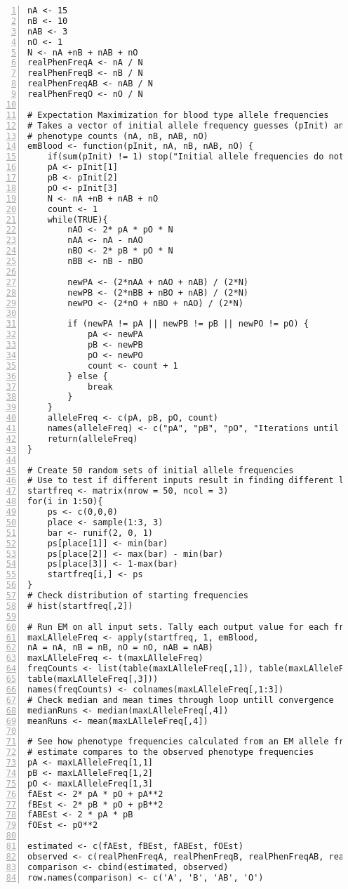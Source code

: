 \documentclass{article}
\begin{document}
	\begin{linenumbers}
		\begin{Verbatim}[numbers=left]
nA <- 15
nB <- 10
nAB <- 3
nO <- 1 
N <- nA +nB + nAB + nO
realPhenFreqA <- nA / N 
realPhenFreqB <- nB / N
realPhenFreqAB <- nAB / N
realPhenFreqO <- nO / N

# Expectation Maximization for blood type allele frequencies
# Takes a vector of initial allele frequency guesses (pInit) and observed
# phenotype counts (nA, nB, nAB, nO)
emBlood <- function(pInit, nA, nB, nAB, nO) {
	if(sum(pInit) != 1) stop("Initial allele frequencies do not sum to 1")
	pA <- pInit[1]
	pB <- pInit[2]
	pO <- pInit[3]
	N <- nA +nB + nAB + nO
	count <- 1
	while(TRUE){
		nAO <- 2* pA * pO * N
		nAA <- nA - nAO
		nBO <- 2* pB * pO * N
		nBB <- nB - nBO
		
		newPA <- (2*nAA + nAO + nAB) / (2*N)
		newPB <- (2*nBB + nBO + nAB) / (2*N)
		newPO <- (2*nO + nBO + nAO) / (2*N)
		
		if (newPA != pA || newPB != pB || newPO != pO) {
			pA <- newPA
			pB <- newPB
			pO <- newPO
			count <- count + 1
		} else {
			break
		}
	}
	alleleFreq <- c(pA, pB, pO, count)
	names(alleleFreq) <- c("pA", "pB", "pO", "Iterations until Convergence")
	return(alleleFreq)
}

# Create 50 random sets of initial allele frequencies
# Use to test if different inputs result in finding different local maxima
startfreq <- matrix(nrow = 50, ncol = 3)
for(i in 1:50){
	ps <- c(0,0,0)
	place <- sample(1:3, 3)
	bar <- runif(2, 0, 1)
	ps[place[1]] <- min(bar)
	ps[place[2]] <- max(bar) - min(bar)
	ps[place[3]] <- 1-max(bar)
	startfreq[i,] <- ps
}
# Check distribution of starting frequencies
# hist(startfreq[,2]) 

# Run EM on all input sets. Tally each output value for each frequency
maxLAlleleFreq <- apply(startfreq, 1, emBlood, 
nA = nA, nB = nB, nO = nO, nAB = nAB)
maxLAlleleFreq <- t(maxLAlleleFreq)
freqCounts <- list(table(maxLAlleleFreq[,1]), table(maxLAlleleFreq[,2]), 
table(maxLAlleleFreq[,3]))
names(freqCounts) <- colnames(maxLAlleleFreq[,1:3])
# Check median and mean times through loop untill convergence
medianRuns <- median(maxLAlleleFreq[,4])
meanRuns <- mean(maxLAlleleFreq[,4])

# See how phenotype frequencies calculated from an EM allele frequency
# estimate compares to the observed phenotype frequencies
pA <- maxLAlleleFreq[1,1]
pB <- maxLAlleleFreq[1,2]
pO <- maxLAlleleFreq[1,3]
fAEst <- 2* pA * pO + pA**2
fBEst <- 2* pB * pO + pB**2
fABEst <- 2 * pA * pB
fOEst <- pO**2

estimated <- c(fAEst, fBEst, fABEst, fOEst)
observed <- c(realPhenFreqA, realPhenFreqB, realPhenFreqAB, realPhenFreqO)
comparison <- cbind(estimated, observed)
row.names(comparison) <- c('A', 'B', 'AB', 'O')
		\end{Verbatim}
	\end{linenumbers}
	
\end{document}
